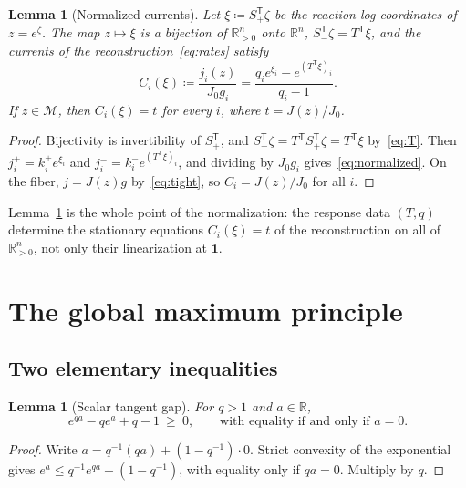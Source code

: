\documentclass[11pt,a4paper]{article}
\theoremstyle{plain}
\newtheorem{lemma}[theorem]{Lemma}
\theoremstyle{definition}
\theoremstyle{remark}
\numberwithin{equation}{section}
\newcommand{\R}{\mathbb{R}}
\newcommand{\T}{\mathsf{T}}
\newcommand{\Sp}{S_{+}}
\newcommand{\Sm}{S_{-}}
\newcommand{\one}{\mathbf{1}}
\newcommand{\fiber}{\mathcal{M}}
\begin{document}
\begin{lemma}[Normalized currents]\label{lem:normalized}
Let $\xi\coloneqq\Sp^{\T}\zeta$ be the reaction log-coordinates of $z=e^{\zeta}$. The map $z\mapsto\xi$ is a bijection of $\R^n_{>0}$ onto $\R^n$, $\Sm^{\T}\zeta=T^{\T}\xi$, and the currents of the reconstruction~\eqref{eq:rates} satisfy
\begin{equation}\label{eq:normalized}
 C_i(\xi)\coloneqq\frac{j_i(z)}{J_0g_i}=\frac{q_ie^{\xi_i}-e^{(T^{\T}\xi)_i}}{q_i-1}.
\end{equation}
If $z\in\fiber$, then $C_i(\xi)=t$ for every $i$, where $t=J(z)/J_0$.
\end{lemma}
\begin{proof}
Bijectivity is invertibility of $\Sp^{\T}$, and $\Sm^{\T}\zeta=T^{\T}\Sp^{\T}\zeta=T^{\T}\xi$ by~\eqref{eq:T}. Then $j^+_i=k^+_ie^{\xi_i}$ and $j^-_i=k^-_ie^{(T^{\T}\xi)_i}$, and dividing by $J_0g_i$ gives~\eqref{eq:normalized}. On the fiber, $j=J(z)g$ by~\eqref{eq:tight}, so $C_i=J(z)/J_0$ for all $i$.
\end{proof}

Lemma~\ref{lem:normalized} is the whole point of the normalization: the response data $(T,q)$ determine the stationary equations $C_i(\xi)=t$ of the reconstruction on all of $\R^n_{>0}$, not only their linearization at $\one$.

\section{The global maximum principle}\label{sec:global}

\subsection{Two elementary inequalities}

\begin{lemma}[Scalar tangent gap]\label{lem:scalar}
For $q>1$ and $a\in\R$,
\begin{equation}\label{eq:scalar}
 e^{qa}-qe^{a}+q-1\ \ge\ 0,\qquad\text{with equality if and only if }a=0 .
\end{equation}
\end{lemma}
\begin{proof}
Write $a=q^{-1}(qa)+(1-q^{-1})\cdot0$. Strict convexity of the exponential gives $e^{a}\le q^{-1}e^{qa}+(1-q^{-1})$, with equality only if $qa=0$. Multiply by $q$.
\end{proof}
\end{document}
